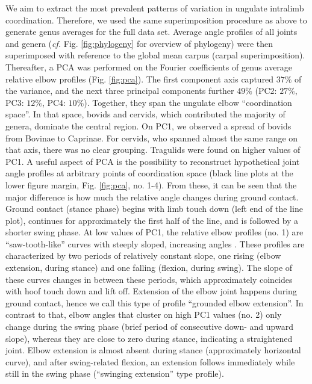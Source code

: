 We aim to extract the most prevalent patterns of variation in ungulate intralimb coordination.
Therefore, we used the same superimposition procedure as above to generate genus averages for the full data set.
Average  angle profiles of all joints and genera (\textit{cf.} Fig. \ref*{fig:phylogeny} for overview of phylogeny) were  then superimposed with reference to the global mean carpus (carpal superimposition).
Thereafter, a PCA was performed on the Fourier coefficients of genus average relative elbow profiles (Fig. \ref{fig:pca}).
The first component axis captured $37\%$ of the variance, and the next three principal components further $49\%$ (PC2: $27\%$, PC3: $12\%$, PC4: $10\%$).
Together, they span the ungulate elbow ``coordination space''.
In that space, bovids and cervids, which contributed the majority of genera, dominate the central region.
On PC1, we observed a spread of bovids from {Bovinae} to {Caprinae}.
For cervids, who spanned almost the same range on that axis, there was no clear grouping.
Tragulids were found on higher values of PC1.
A useful aspect of PCA is the possibility to reconstruct hypothetical joint angle profiles at arbitrary points of coordination space (black line plots at the lower figure margin, Fig. \ref{fig:pca}, no. 1-4).
From these, it can be seen that the major difference is how much the relative  angle changes during ground contact.
Ground contact (stance phase) begins with limb touch down (left end of the line plot), continues for approximately the first half of the line, and is followed by a shorter swing phase.
At low values of PC1, the relative elbow profiles (no. 1) are ``saw-tooth-like'' curves with steeply sloped, increasing  angles .
These profiles are characterized by two periods of relatively constant slope, one rising (elbow extension, during stance) and one falling (flexion, during swing).
The slope of these curves changes in between these periods, which approximately coincides with hoof touch down and lift off.
Extension of the elbow joint happens during ground contact, hence we call this type of profile ``grounded elbow extension''.
In contrast to that, elbow  angles that cluster on high PC1 values (no. 2) only change during the swing phase (brief period of consecutive down- and upward slope), whereas they are close to zero during stance, indicating a straightened joint.
Elbow extension is almost absent during stance (approximately horizontal curve), and after swing-related flexion, an extension follows immediately while still in the swing phase (``swinging extension'' type profile).
